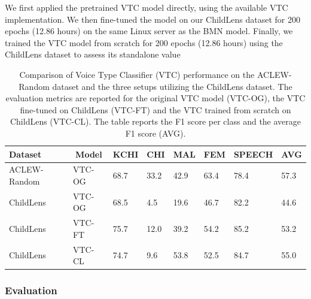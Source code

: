\documentclass[
  man,floatsintext]{apa6}
\begin{document}
We first applied the pretrained VTC model directly, using the available VTC implementation. We then fine-tuned the model on our ChildLens dataset for 200 epochs (12.86 hours) on the same Linux server as the BMN model. Finally, we trained the VTC model from scratch for 200 epochs (12.86 hours) using the ChildLens dataset to assess its standalone value

\begin{table}[tbp]

\begin{center}
\begin{threeparttable}

\caption{\label{tab:vtc-results}Comparison of Voice Type Classifier (VTC) performance on the ACLEW-Random dataset and the three setups utilizing the ChildLens dataset. The evaluation metrics are reported for the original VTC model (VTC-OG), the VTC fine-tuned on ChildLens (VTC-FT) and the VTC trained from scratch on ChildLens (VTC-CL). The table reports the F1 score per class and the average F1 score (AVG).
}

\begin{tabular}{llllllll}
\toprule
Dataset & \multicolumn{1}{c}{Model} & \multicolumn{1}{c}{KCHI} & \multicolumn{1}{c}{CHI} & \multicolumn{1}{c}{MAL} & \multicolumn{1}{c}{FEM} & \multicolumn{1}{c}{SPEECH} & \multicolumn{1}{c}{AVG}\\
\midrule
ACLEW-Random & VTC-OG & 68.7 & 33.2 & 42.9 & 63.4 & 78.4 & 57.3\\
ChildLens & VTC-OG & 68.5 & 4.5 & 19.6 & 46.7 & 82.2 & 44.6\\
ChildLens & VTC-FT & 75.7 & 12.0 & 39.2 & 54.2 & 85.2 & 53.2\\
ChildLens & VTC-CL & 74.7 & 9.6 & 53.8 & 52.5 & 84.7 & 55.0\\
\bottomrule
\end{tabular}

\end{threeparttable}
\end{center}

\end{table}

\subsubsection{Evaluation}\label{evaluation-1}
\end{document}
